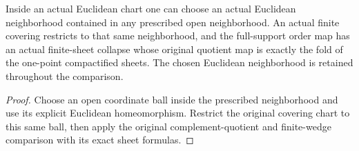\begin{proposition}
  \label{prop:actual-finite-ball-collapse}
  \leanok
  Inside an actual Euclidean chart one can choose an actual Euclidean neighborhood contained in any prescribed open neighborhood. An actual finite covering restricts to that same neighborhood, and the full-support order map has an actual finite-sheet collapse whose original quotient map is exactly the fold of the one-point compactified sheets. The chosen Euclidean neighborhood is retained throughout the comparison.
\end{proposition}
\begin{proof}
  Choose an open coordinate ball inside the prescribed neighborhood and use its explicit Euclidean homeomorphism. Restrict the original covering chart to this same ball, then apply the original complement-quotient and finite-wedge comparison with its exact sheet formulas.
  \leanok
\end{proof}

